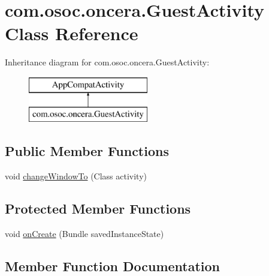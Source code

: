 \hypertarget{classcom_1_1osoc_1_1oncera_1_1_guest_activity}{}\section{com.\+osoc.\+oncera.\+Guest\+Activity Class Reference}
\label{classcom_1_1osoc_1_1oncera_1_1_guest_activity}
Inheritance diagram for com.\+osoc.\+oncera.\+Guest\+Activity\+:\begin{figure}[H]
\begin{center}
\leavevmode
\includegraphics[height=2.000000cm]{classcom_1_1osoc_1_1oncera_1_1_guest_activity}
\end{center}
\end{figure}
\subsection*{Public Member Functions}
\begin{DoxyCompactItemize}
\item 
void \mbox{\hyperlink{classcom_1_1osoc_1_1oncera_1_1_guest_activity_ad0894938c20bf7fd14968e94449f735a}{change\+Window\+To}} (Class activity)
\end{DoxyCompactItemize}
\subsection*{Protected Member Functions}
\begin{DoxyCompactItemize}
\item 
void \mbox{\hyperlink{classcom_1_1osoc_1_1oncera_1_1_guest_activity_a165acce74d9449a855c0e4c30cd038d0}{on\+Create}} (Bundle saved\+Instance\+State)
\end{DoxyCompactItemize}


\subsection{Member Function Documentation}
\mbox{\label{classcom_1_1osoc_1_1oncera_1_1_guest_activity_ad0894938c20bf7fd14968e94449f735a}} 

